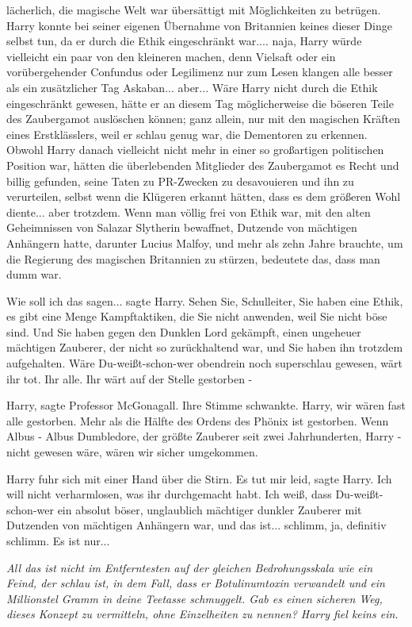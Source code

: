 lächerlich, die magische Welt war übersättigt mit Möglichkeiten zu betrügen.
Harry konnte bei seiner eigenen Übernahme von Britannien keines dieser Dinge
selbst tun, da er durch die Ethik eingeschränkt war.... naja, Harry würde
vielleicht ein paar von den kleineren machen, denn Vielsaft oder ein
vorübergehender Confundus oder Legilimenz nur zum Lesen klangen alle besser als
ein zusätzlicher Tag Askaban... aber... Wäre Harry nicht durch die Ethik
eingeschränkt gewesen, hätte er an diesem Tag möglicherweise die böseren Teile
des Zaubergamot auslöschen können; ganz allein, nur mit den magischen Kräften
eines Erstklässlers, weil er schlau genug war, die Dementoren zu erkennen.
Obwohl Harry danach vielleicht nicht mehr in einer so großartigen politischen
Position war, hätten die überlebenden Mitglieder des Zaubergamot es Recht und
billig gefunden, seine Taten zu PR-Zwecken zu desavouieren und ihn zu
verurteilen, selbst wenn die Klügeren erkannt hätten, dass es dem größeren Wohl
diente... aber trotzdem. Wenn man völlig frei von Ethik war, mit den alten
Geheimnissen von Salazar Slytherin bewaffnet, Dutzende von mächtigen Anhängern
hatte, darunter Lucius Malfoy, und mehr als zehn Jahre brauchte, um die
Regierung des magischen Britannien zu stürzen, bedeutete das, dass man dumm war.

\glqq Wie soll ich das sagen...\grqq{} sagte Harry. \glqq Sehen Sie,
Schulleiter, Sie haben eine Ethik, es gibt eine Menge Kampftaktiken, die Sie
nicht anwenden, weil Sie nicht böse sind. Und Sie haben gegen den Dunklen Lord
gekämpft, einen ungeheuer mächtigen Zauberer, der nicht so zurückhaltend war,
und Sie haben ihn trotzdem aufgehalten. Wäre Du-weißt-schon-wer obendrein noch
superschlau gewesen, wärt ihr tot. Ihr alle. Ihr wärt auf der Stelle gestorben
-\grqq{}

\glqq Harry\grqq{}, sagte Professor McGonagall. Ihre Stimme schwankte. \glqq
Harry, wir wären fast alle gestorben. Mehr als die Hälfte des Ordens des Phönix
ist gestorben. Wenn Albus - Albus Dumbledore, der größte Zauberer seit zwei
Jahrhunderten, Harry - nicht gewesen wäre, wären wir sicher umgekommen.\grqq{}

Harry fuhr sich mit einer Hand über die Stirn. \glqq Es tut mir leid\grqq{},
sagte Harry. \glqq Ich will nicht verharmlosen, was ihr durchgemacht habt. Ich
weiß, dass Du-weißt-schon-wer ein absolut böser, unglaublich mächtiger dunkler
Zauberer mit Dutzenden von mächtigen Anhängern war, und das ist... schlimm, ja,
definitiv schlimm. Es ist nur...\grqq{}

\emph{All das ist nicht im Entferntesten auf der gleichen Bedrohungsskala wie ein Feind, der schlau ist, in dem Fall, dass er Botulinumtoxin verwandelt und ein Millionstel Gramm in deine Teetasse schmuggelt. Gab es einen sicheren Weg, dieses Konzept zu vermitteln, ohne Einzelheiten zu nennen? Harry fiel keins ein. }

